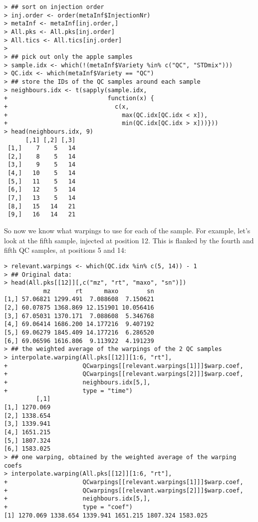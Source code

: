 \documentclass[a4paper,11pt]{article}\usepackage[]{graphicx}\usepackage[]{color}
\makeatletter
\newenvironment{kframe}{%
 \def\at@end@of@kframe{}%
 \ifinner\ifhmode%
  \def\at@end@of@kframe{\end{minipage}}%
  \begin{minipage}{\columnwidth}%
 \fi\fi%
 \def\FrameCommand##1{\hskip\@totalleftmargin \hskip-\fboxsep
 \colorbox{shadecolor}{##1}\hskip-\fboxsep
     \hskip-\linewidth \hskip-\@totalleftmargin \hskip\columnwidth}%
 \MakeFramed {\advance\hsize-\width
   \@totalleftmargin\z@ \linewidth\hsize
   \@setminipage}}%
 {\par\unskip\endMakeFramed%
 \at@end@of@kframe}
\newenvironment{knitrout}{}{} %
\makeatother
\begin{document}
\begin{knitrout}\small
{}\color{fgcolor}\begin{kframe}
\begin{verbatim}
> ## sort on injection order
> inj.order <- order(metaInf$InjectionNr)
> metaInf <- metaInf[inj.order,]
> All.pks <- All.pks[inj.order]
> All.tics <- All.tics[inj.order]
> 
> ## pick out only the apple samples
> sample.idx <- which(!(metaInf$Variety %in% c("QC", "STDmix")))
> QC.idx <- which(metaInf$Variety == "QC")
> ## store the IDs of the QC samples around each sample
> neighbours.idx <- t(sapply(sample.idx,
+                            function(x) {
+                              c(x, 
+                                max(QC.idx[QC.idx < x]),
+                                min(QC.idx[QC.idx > x]))}))
> head(neighbours.idx, 9)
      [,1] [,2] [,3]
 [1,]    7    5   14
 [2,]    8    5   14
 [3,]    9    5   14
 [4,]   10    5   14
 [5,]   11    5   14
 [6,]   12    5   14
 [7,]   13    5   14
 [8,]   15   14   21
 [9,]   16   14   21
\end{verbatim}
\end{kframe}
\end{knitrout}

\noindent
So now we know what warpings to use for each of the sample. For
example, let's look at the fifth sample, injected at position 12. This
is flanked by the fourth and fifth QC samples, at positions 5 and 14:

\begin{knitrout}\small
{}\color{fgcolor}\begin{kframe}
\begin{verbatim}
> relevant.warpings <- which(QC.idx %in% c(5, 14)) - 1
> ## Original data:
> head(All.pks[[12]][,c("mz", "rt", "maxo", "sn")])
           mz       rt      maxo        sn
[1,] 57.06821 1299.491  7.088608  7.150621
[2,] 60.07875 1368.869 12.151901 10.056416
[3,] 67.05031 1370.171  7.088608  5.346768
[4,] 69.06414 1686.200 14.177216  9.407192
[5,] 69.06279 1845.409 14.177216  6.286520
[6,] 69.06596 1616.806  9.113922  4.191239
> ## the weighted average of the warpings of the 2 QC samples
> interpolate.warping(All.pks[[12]][1:6, "rt"],
+                     QCwarpings[[relevant.warpings[1]]]$warp.coef,
+                     QCwarpings[[relevant.warpings[2]]]$warp.coef,
+                     neighbours.idx[5,],
+                     type = "time")
         [,1]
[1,] 1270.069
[2,] 1338.654
[3,] 1339.941
[4,] 1651.215
[5,] 1807.324
[6,] 1583.025
> ## one warping, obtained by the weighted average of the warping coefs
> interpolate.warping(All.pks[[12]][1:6, "rt"],
+                     QCwarpings[[relevant.warpings[1]]]$warp.coef,
+                     QCwarpings[[relevant.warpings[2]]]$warp.coef,
+                     neighbours.idx[5,],
+                     type = "coef")               
[1] 1270.069 1338.654 1339.941 1651.215 1807.324 1583.025
\end{verbatim}
\end{kframe}
\end{knitrout}
\end{document}
